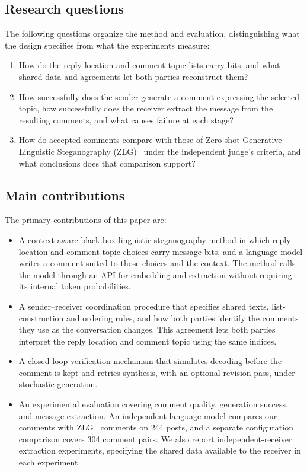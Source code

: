 \subsection{Research questions}
\label{sec:research-questions}
The following questions organize the method and evaluation, distinguishing what the design specifies from what the experiments measure:
\begin{enumerate}
    \item How do the reply-location and comment-topic lists carry bits, and what shared data and agreements let both parties reconstruct them?
    \item How successfully does the sender generate a comment expressing the selected topic, how successfully does the receiver extract the message from the resulting comments, and what causes failure at each stage?
    \item How do accepted comments compare with those of Zero-shot Generative Linguistic Steganography (ZLG)~\cite{lin2024zero} under the independent judge's criteria, and what conclusions does that comparison support?
\end{enumerate}

\subsection{Main contributions}
The primary contributions of this paper are:
\begin{itemize}
    \item A context-aware black-box linguistic steganography method in which reply-location and comment-topic choices carry message bits, and a language model writes a comment suited to those choices and the context. The method calls the model through an API for embedding and extraction without requiring its internal token probabilities.
    \item A sender--receiver coordination procedure that specifies shared texts, list-construction and ordering rules, and how both parties identify the comments they use as the conversation changes. This agreement lets both parties interpret the reply location and comment topic using the same indices.
    \item A closed-loop verification mechanism that simulates decoding before the comment is kept and retries synthesis, with an optional revision pass, under stochastic generation.
    \item An experimental evaluation covering comment quality, generation success, and message extraction. An independent language model compares our comments with ZLG~\cite{lin2024zero} comments on 244 posts, and a separate configuration comparison covers 304 comment pairs. We also report independent-receiver extraction experiments, specifying the shared data available to the receiver in each experiment.
\end{itemize}


